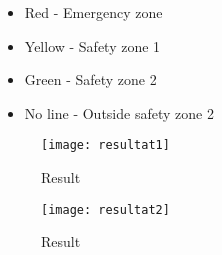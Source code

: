 \begin{itemize}
  \item Red - Emergency zone
  \item Yellow - Safety zone 1 
  \item Green - Safety zone 2
  \item No line - Outside safety zone 2 
\end{itemize}

\begin{figure}[H]
\begin{center}
\texttt{[image: resultat1]}

\caption{Result}
\end{center}
\end{figure}

\begin{figure}[H]
\begin{center}
\texttt{[image: resultat2]}

\caption{Result}
\end{center}
\end{figure}
